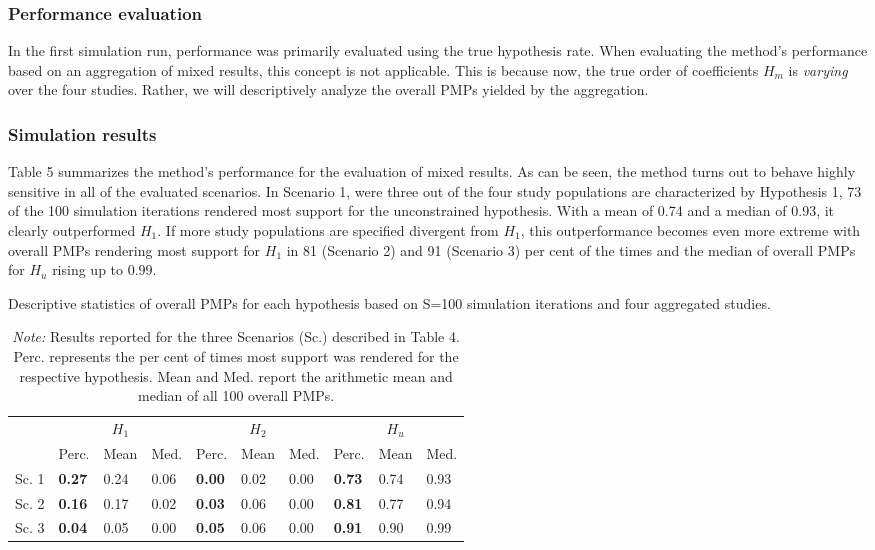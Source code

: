 \documentclass[11pt, a4paper]{article} %
\begin{document}
\subsubsection{Performance evaluation}
\noindent In the first simulation run, performance was primarily evaluated using the true hypothesis rate. When evaluating the method's performance based on an aggregation of mixed results, this concept is not applicable. This is because now, the true order of coefficients $H_m$ is \textit{varying} over the four studies. Rather, we will descriptively analyze the overall PMPs yielded by the aggregation. 

\subsubsection{Simulation results}
\noindent Table 5 summarizes the method's performance for the evaluation of mixed results. As can be seen, the method turns out to behave highly sensitive in all of the evaluated scenarios. In Scenario 1, were three out of the four study populations are characterized by Hypothesis 1, 73 of the 100 simulation iterations rendered most support for the unconstrained hypothesis. With a mean of 0.74 and a median of 0.93, it clearly outperformed $H_1$. If more study populations are specified divergent from $H_1$, this outperformance becomes even more extreme with overall PMPs rendering most support for $H_1$ in 81 (Scenario 2) and 91 (Scenario 3) per cent of the times and the median of overall PMPs for $H_u$ rising up to 0.99. 

\begin{table}[H]
	\centering
	\caption{Descriptive statistics of overall PMPs for each hypothesis based on S=100 simulation iterations and four aggregated studies.}
	\label{my-label}
	\begin{tabular}{llllllllll}
		\hline
		&               & \multicolumn{1}{c}{$H_1$} &        &               & \multicolumn{1}{c}{$H_2$} &        &               & \multicolumn{1}{c}{$H_u$} &        \\
		& Perc.         & Mean                      & Med. & Perc.         & Mean                      & Med. & Perc.         & Mean                      & Med. \\ \hline
		Sc. 1 & \textbf{0.27} & 0.24                      & 0.06   & \textbf{0.00} & 0.02                      & 0.00   & \textbf{0.73} & 0.74                      & 0.93   \\
		Sc. 2 & \textbf{0.16} & 0.17                      & 0.02   & \textbf{0.03} & 0.06                      & 0.00   & \textbf{0.81} & 0.77                      & 0.94   \\
		Sc. 3 & \textbf{0.04} & 0.05                      & 0.00   & \textbf{0.05} & 0.06                      & 0.00   & \textbf{0.91} & 0.90                      & 0.99   \\ \hline
	\end{tabular}
\caption*{\textit{Note:} Results reported for the three Scenarios (Sc.) described in Table 4. Perc. represents the per cent of times most support was rendered for the respective hypothesis. Mean and Med. report the arithmetic mean and median of all 100 overall PMPs.}
\end{table}
\end{document}
